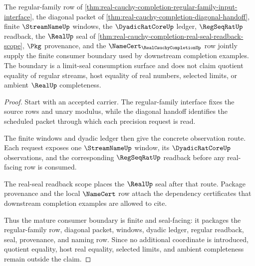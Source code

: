 \begin{theorem}
\label{thm:real-cauchy-completion-mature-limit-seal-consumption}
The regular-family row of \autoref{thm:real-cauchy-completion-regular-family-input-interface}, the diagonal packet of \autoref{thm:real-cauchy-completion-diagonal-handoff}, finite $\StreamNameUp$ windows, the $\DyadicRatCoreUp$ ledger, $\RegSeqRatUp$ readback, the $\RealUp$ seal of \autoref{thm:real-cauchy-completion-real-seal-readback-scope}, $\Pkg$ provenance, and the $\NameCert_{\RealCauchyCompletionUp}$ row jointly supply the finite consumer boundary used by downstream completion examples. The boundary is a limit-seal consumption surface and does not claim quotient equality of regular streams, host equality of real numbers, selected limits, or ambient $\RealUp$ completeness.
\end{theorem}
\begin{proof}
Start with an accepted carrier. The regular-family interface fixes the source rows and unary modulus, while the diagonal handoff identifies the scheduled packet through which each precision request is read.

The finite windows and dyadic ledger then give the concrete observation route. Each request exposes one $\StreamNameUp$ window, its $\DyadicRatCoreUp$ observations, and the corresponding $\RegSeqRatUp$ readback before any real-facing row is consumed.

The real-seal readback scope places the $\RealUp$ seal after that route. Package provenance and the local $\NameCert$ row attach the dependency certificates that downstream completion examples are allowed to cite.

Thus the mature consumer boundary is finite and seal-facing: it packages the regular-family row, diagonal packet, windows, dyadic ledger, regular readback, seal, provenance, and naming row. Since no additional coordinate is introduced, quotient equality, host real equality, selected limits, and ambient completeness remain outside the claim.
\end{proof}

